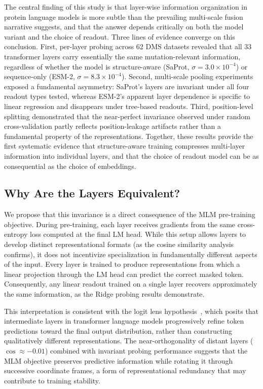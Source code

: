 \documentclass[11pt,a4paper]{article}
\begin{document}
The central finding of this study is that layer-wise information organization in
protein language models is more subtle than the prevailing multi-scale fusion
narrative suggests, and that the answer depends critically on both the model variant
and the choice of readout. Three lines of evidence converge on this conclusion.
First, per-layer probing across 62 DMS datasets revealed that all 33 transformer
layers carry essentially the same mutation-relevant information, regardless of
whether the model is structure-aware (SaProt, $\sigma = 3.0 \times 10^{-4}$) or
sequence-only (ESM-2, $\sigma = 8.3 \times 10^{-4}$). Second, multi-scale pooling
experiments exposed a fundamental asymmetry: SaProt's layers are invariant under
all four readout types tested, whereas ESM-2's apparent layer dependence is
specific to linear regression and disappears under tree-based readouts. Third,
position-level splitting demonstrated that the near-perfect invariance observed under
random cross-validation partly reflects position-leakage artifacts rather than a
fundamental property of the representations. Together, these results provide the
first systematic evidence that structure-aware training compresses multi-layer
information into individual layers, and that the choice of readout model can be
as consequential as the choice of embeddings.

\subsection{Why Are the Layers Equivalent?}

We propose that this invariance is a direct consequence of the MLM pre-training
objective. During pre-training, each layer receives gradients from the same
cross-entropy loss computed at the final LM head. While this setup allows layers
to develop distinct representational formats (as the cosine similarity analysis
confirms), it does not incentivize specialization in fundamentally different
aspects of the input. Every layer is trained to produce representations from which
a linear projection through the LM head can predict the correct masked token.
Consequently, any linear readout trained on a single layer recovers approximately
the same information, as the Ridge probing results demonstrate.

This interpretation is consistent with the logit lens hypothesis~\cite{nostalgebraist2020},
which posits that intermediate layers in transformer language models progressively
refine token predictions toward the final output distribution, rather than
constructing qualitatively different representations. The near-orthogonality of
distant layers ($\cos \approx -0.01$) combined with invariant probing performance
suggests that the MLM objective preserves predictive information while rotating it
through successive coordinate frames, a form of representational redundancy that
may contribute to training stability.
\end{document}
